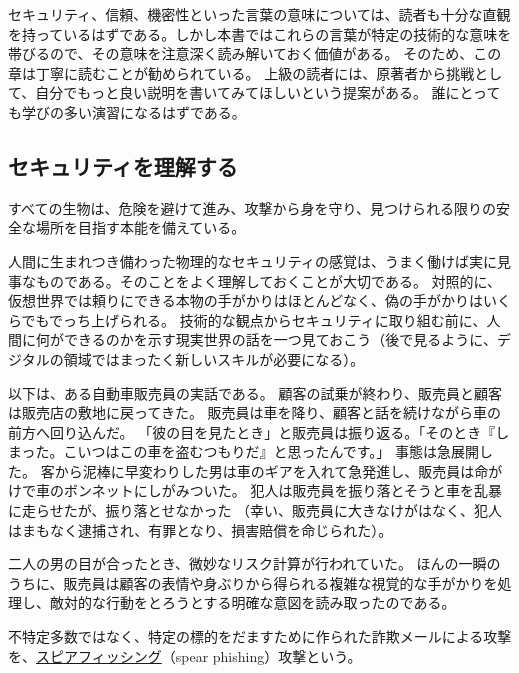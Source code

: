 \documentclass[uplatex]{jsarticle}
\def\label#1{}%
\begin{document}
セキュリティ、信頼、機密性といった言葉の意味については、読者も十分な直観を持っているはずである。しかし本書ではこれらの言葉が特定の技術的な意味を帯びるので、その意味を注意深く読み解いておく価値がある。
そのため、この章は丁寧に読むことが勧められている。
上級の読者には、原著者から挑戦として、自分でもっと良い説明を書いてみてほしいという提案がある。
誰にとっても学びの多い演習になるはずである。

\subsection{セキュリティを理解する}

すべての生物は、危険を避けて進み、攻撃から身を守り、見つけられる限りの安全な場所を目指す本能を備えている。

人間に生まれつき備わった物理的なセキュリティの感覚は、うまく働けば実に見事なものである。そのことをよく理解しておくことが大切である。
対照的に、仮想世界では頼りにできる本物の手がかりはほとんどなく、偽の手がかりはいくらでもでっち上げられる。
技術的な観点からセキュリティに取り組む前に、人間に何ができるのかを示す現実世界の話を一つ見ておこう（後で見るように、デジタルの領域ではまったく新しいスキルが必要になる）。

\begin{exa}[自動車販売員の実話]\label{exa:ch1-car-salesman}
以下は、ある自動車販売員の実話である。
顧客の試乗が終わり、販売員と顧客は販売店の敷地に戻ってきた。
販売員は車を降り、顧客と話を続けながら車の前方へ回り込んだ。
「彼の目を見たとき」と販売員は振り返る。「そのとき『しまった。こいつはこの車を盗むつもりだ』と思ったんです。」
事態は急展開した。
客から泥棒に早変わりした男は車のギアを入れて急発進し、販売員は命がけで車のボンネットにしがみついた。
犯人は販売員を振り落とそうと車を乱暴に走らせたが、振り落とせなかった
（幸い、販売員に大きなけがはなく、犯人はまもなく逮捕され、有罪となり、損害賠償を命じられた）。
\end{exa}

二人の男の目が合ったとき、微妙なリスク計算が行われていた。
ほんの一瞬のうちに、販売員は顧客の表情や身ぶりから得られる複雑な視覚的な手がかりを処理し、敵対的な行動をとろうとする明確な意図を読み取ったのである。

\begin{dfn}[スピアフィッシング]\label{dfn:ch1-spear-phishing}
不特定多数ではなく、特定の標的をだますために作られた詐欺メールによる攻撃を、\underline{スピアフィッシング}（spear phishing）攻撃という。
\end{dfn}
\end{document}
